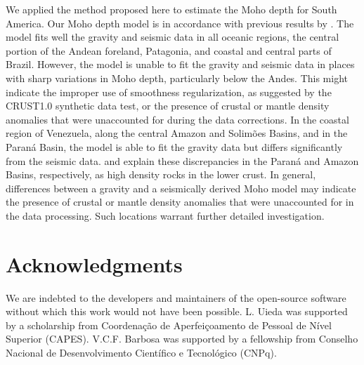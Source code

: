 \documentclass[extra,mreferee]{gji}
\begin{document}
We applied the method proposed here to estimate the Moho depth for South
America.
Our Moho depth model is in accordance with previous results by
\citet{vandermeijde2013}.
The model fits well the gravity and seismic data in all oceanic regions, the
central portion of the Andean foreland, Patagonia, and coastal and central
parts of Brazil.
However, the model is unable to fit the gravity and seismic data in places with
sharp variations in Moho depth, particularly below the Andes.
This might indicate the improper use of smoothness regularization, as suggested
by the CRUST1.0 synthetic data test, or the presence of crustal or mantle
density anomalies that were unaccounted for during the data corrections.
In the coastal region of Venezuela, along the central Amazon and Solimões
Basins, and in the Paraná Basin, the model is able to fit the gravity data but
differs significantly from the seismic data.
\citet{mariani2013} and \citet{nunn1988} explain these discrepancies in the
Paraná and Amazon Basins, respectively, as high density rocks in the lower
crust.
In general, differences between a gravity and a seismically derived Moho model
may indicate the presence of crustal or mantle density anomalies that were
unaccounted for in the data processing.
Such locations warrant further detailed investigation.



\section{Acknowledgments}

We are indebted to the developers and maintainers of the open-source
software without which this work would not have been possible.
L. Uieda was supported by a scholarship from
Coordenação de Aperfeiçoamento de Pessoal de Nível Superior
(CAPES).
V.C.F. Barbosa was supported by a fellowship from
Conselho Nacional de Desenvolvimento Científico e Tecnológico (CNPq).




\end{document}
